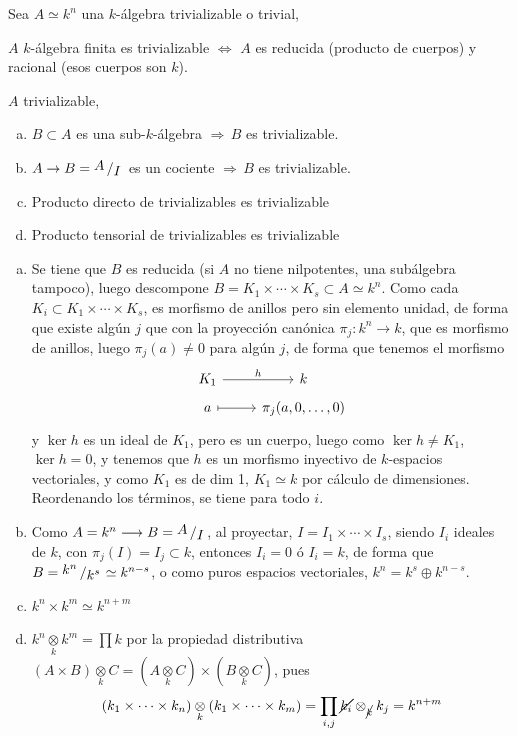      Sea $A \simeq k^n$ una $k$-\'algebra trivializable o trivial,
\begin{lem}
    $A$ $k$-\'algebra finita es trivializable $\iff$ $A$ es reducida (producto de cuerpos) y racional (esos cuerpos son $k$). 
\end{lem}
\begin{teo}
    $A$ trivializable, 
    \begin{enumerate}[a)]
        \item  $B \subset A$ es una sub-$k$-\'algebra $\Rightarrow \, B$ es trivializable. 
        \item $A \to B = \modulo{A}{I}$ es un cociente $\Rightarrow \, B$ es trivializable.
        \item Producto directo de trivializables es trivializable
        \item Producto tensorial de trivializables es trivializable
    \end{enumerate}
\end{teo}
\begin{dem}
    \begin{enumerate}[a)]
        \item Se tiene que $B$ es reducida (si $A$ no tiene nilpotentes, una sub\'algebra tampoco), luego descompone $B = K_1 \times \cdots \times K_s \subset A \simeq k^n$. Como cada $K_i \subset K_1 \times \cdots \times K_s$, es morfismo de anillos pero sin elemento unidad, de forma que existe alg\'un $j$ que con la proyecci\'on can\'onica $\pi_j: k^n \longrightarrow k$, que es morfismo de anillos, luego $\pi_j(a) \neq 0$ para alg\'un $j$, de forma que tenemos el morfismo 
        $$\bt K_1 \rar{h} & k \\[-5mm] a \rarmaps & \pi_j(a,0,\ldots,0)  \et$$
        y $\ker h $ es un ideal de $K_1$, pero es un cuerpo, luego como $\ker h\neq K_1$, $\ker h=0$, y tenemos que $h$ es un morfismo inyectivo de $k$-espacios vectoriales, y como $K_1$ es de dim 1, $K_1 \simeq k$ por c\'alculo de dimensiones. Reordenando los t\'erminos, se tiene para todo $i$. 
        \item Como $A=k^n \longrightarrow B = \modulo{A}{I}$, al proyectar, $I = I_1 \times \cdots \times I_s$, siendo $I_i$ ideales de $k$, con $\pi_j(I) = I_j \subset k$, entonces $I_i = 0$ \'o $I_i = k$, de forma que $B = \modulo{k^n}{k^s} \simeq k^{n-s}$, o como puros espacios vectoriales, $k^n = k^s \oplus k^{n-s}$. 
        \item $k^n \times k^m \simeq k^{n+m}$
        \item $k^{n} \underset{k}{\otimes} k^m = \prod k$  por la propiedad distributiva $(A\times B) \underset{k}{\otimes} C = (A\underset{k}{\otimes} C) \times (B \underset{k}{\otimes} C)$, pues 
        $$ (k_1 \times \cdots \times k_n)\underset{k}{\otimes} (k_1 \times \cdots \times k_m) = \prod_{i,j} \cancel{k_i} \otimes_{\cancel{k}} k_j = k^{n+m} $$
    \end{enumerate}
\end{dem}
